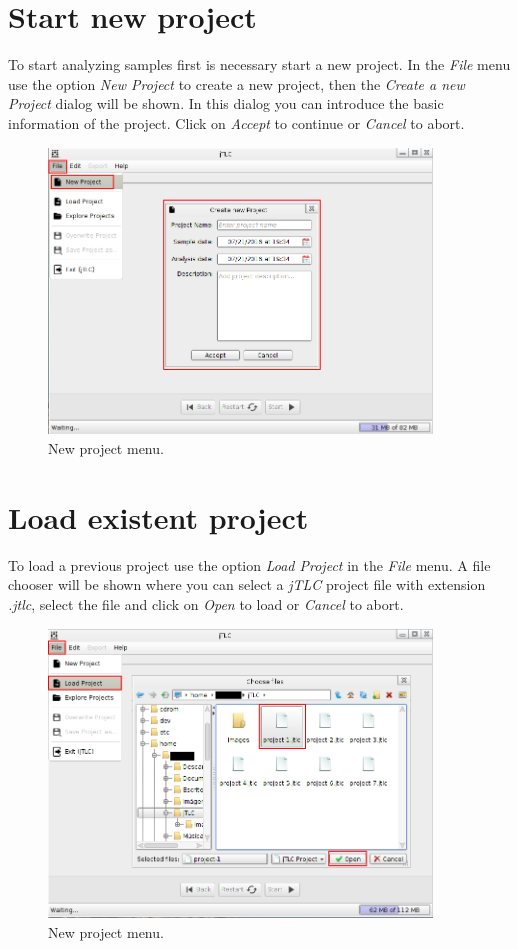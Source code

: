 \section*{Start new project}
To start analyzing samples first is necessary start a new project. In the \emph{File} menu use the option \emph{New Project} to create a new project, then the \emph{Create a new Project} dialog will be shown. In this dialog you can introduce the basic information of the project. Click on \emph{Accept} to continue or \emph{Cancel} to abort.
\begin{figure}[H]
	\vspace{0cm}
	\centering
	\includegraphics[width=385px]{imagenes/new_project}
	\centering
	\vspace{-0.4cm}
	\caption{New project menu.}
	\label{fig:new_project}
	\vspace{-0.25cm}
\end{figure}
\newpage

\section{Load existent project}
To load a previous project use the option \emph{Load Project} in the \emph{File} menu. A file chooser will be shown where you can select a \textit{jTLC} project file with extension \emph{.jtlc}, select the file and click on \emph{Open} to load or \emph{Cancel} to abort.
\begin{figure}[H]
	\vspace{0cm}
	\centering
	\includegraphics[width=385px]{imagenes/load_project}
	\centering
	\vspace{-0.4cm}
	\caption{New project menu.}
	\label{fig:load_project}
	\vspace{-0.25cm}
\end{figure}
\newpage

